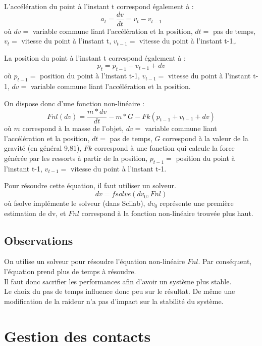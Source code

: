 \documentclass[a4paper]{article}
\begin{document}
L'accélération du point à l'instant t correspond également à :
\begin{equation}
  a_t = \frac{dv}{dt} = v_t - v_{t-1}
\end{equation}
où $dv =$ variable commune liant l'accélération et la position, $dt =$ pas de temps, $v_t =$ vitesse du point à l'instant t, $v_{t-1} =$ vitesse du point à l'instant t-1,.

La position du point à l'instant t correspond également à :
\begin{equation}
  p_t = p_{t-1} + v_{t-1} + dv
\end{equation}
où $p_{t-1} =$ position du point à l'instant t-1, $v_{t-1} =$ vitesse du point à l'instant t-1, $dv =$ variable commune liant l'accélération et la position.

On dispose donc d'une fonction non-linéaire :
\begin{equation}
  Fnl(dv) = \frac{m * dv}{dt} - m * G - Fk( p_{t-1} + v_{t-1} + dv )
\end{equation}
où $m$ correspond à la masse de l'objet, $dv =$ variable commune liant l'accélération et la position, $dt =$ pas de temps, $G$ correspond à la valeur de la gravité (en général 9,81), $Fk$ correspond à une fonction qui calcule la force générée par les ressorts à partir de la position, $p_{t-1} =$ position du point à l'instant t-1, $v_{t-1} =$ vitesse du point à l'instant t-1.

Pour résoudre cette équation, il faut utiliser un solveur.
\begin{equation}
  dv = fsolve(dv_0, Fnl)
\end{equation}
où fsolve implémente le solveur (dans Scilab), $dv_0$ représente une première estimation de dv, et $Fnl$ correspond à la fonction non-linéaire trouvée plus haut.

\subsection{Observations}

On utilise un solveur pour résoudre l'équation non-linéaire $Fnl$.
Par conséquent, l'équation prend plus de temps à résoudre.\\
Il faut donc sacrifier les performances afin d'avoir un système plus stable.\\

Le choix du pas de temps influence donc peu sur le résultat. De même une modification de la raideur n'a pas d'impact sur la stabilité du système.

\section{Gestion des contacts}
\end{document}
